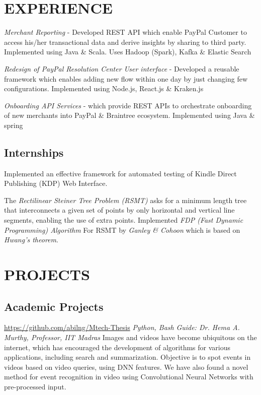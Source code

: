 \documentclass[11pt, a4paper, sans]{moderncv}
\begin{document}
\section{EXPERIENCE}

{\textit{Merchant Reporting} - Developed REST API which enable PayPal Customer to access his/her transactional data and derive insights by sharing to third party. Implemented using Java \& Scala. Uses Hadoop (Spark), Kafka \& Elastic Search}

{\textit{Redesign of \textit{PayPal Resolution Center} User interface} - Developed a reusable framework which enables adding new flow within one day by just changing few configurations. Implemented using Node.js, React.js \& Kraken.js}

{\textit{Onboarding API Services} - which provide REST APIs to orchestrate onboarding of new merchants into PayPal \& Braintree ecosystem. Implemented using Java \& spring }


\subsection{Internships}
{Implemented an effective framework for automated testing of Kindle Direct Publishing (KDP) Web Interface.}

{The \textit{Rectilinear Steiner Tree Problem (RSMT)} asks for a minimum length tree that interconnects a given set of points by only horizontal and vertical line segments, enabling the use of extra points. Implemented \textit{ FDP (Fast Dynamic Programming) Algorithm } For RSMT by \textit{ Ganley \& Cohoon } which is based on \textit{ Hwang’s theorem}}.

\section{PROJECTS}
\subsection{Academic Projects}
{\newline \url{https://github.com/abilng/Mtech-Thesis}}
{\hfill \textit{Python, Bash}}
{\newline \textit{Guide: Dr. Hema A. Murthy, Professor, IIT Madras}}
{Images and videos have become ubiquitous on the internet, which has encouraged the development of algorithms for various applications, including search and summarization. Objective is to spot events in videos based on video queries, using DNN features. We have also found a novel method for event recognition in video using Convolutional Neural Networks with pre-processed input.}
\end{document}
